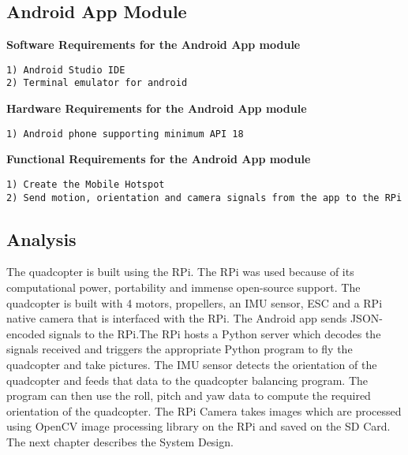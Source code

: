 \subsection{Android App Module}
\noindent
\textbf{Software Requirements for the Android App module }
\begin{verbatim}
1) Android Studio IDE
2) Terminal emulator for android
\end{verbatim}
\textbf{Hardware Requirements for the Android App module}
\begin{verbatim}
1) Android phone supporting minimum API 18
\end{verbatim}
\textbf{Functional Requirements for the Android App module}
\begin{verbatim}
1) Create the Mobile Hotspot
2) Send motion, orientation and camera signals from the app to the RPi
\end{verbatim}
\subsection{Analysis}
The quadcopter is built using the RPi. The RPi was used because of its computational power, portability and immense open-source support. The quadcopter is built with 4 motors, propellers, an IMU sensor, ESC and a RPi native camera that is interfaced with the RPi. The Android app sends JSON-encoded signals to the RPi.The RPi hosts a Python server which decodes the signals received and triggers the appropriate Python program to fly the quadcopter and take pictures. The IMU sensor detects the orientation of the quadcopter and feeds that data to the quadcopter balancing program. The program can then use the roll, pitch and yaw data to compute the required orientation of the quadcopter. The RPi Camera takes images which are processed using OpenCV image processing library on the RPi and saved on the SD Card.
\newline \newline
The next chapter describes the System Design.